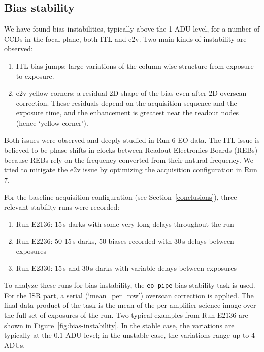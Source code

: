 
\subsection{Bias stability}\label{sec:bias-stability-2}

We have found bias instabilities, typically above the 1 ADU level, for a number of CCDs in the focal plane, both ITL and e2v. Two main kinds of instability are observed:

\begin{enumerate}
\tightlist
\item
  ITL bias jumps: large variations of the column-wise structure from
  exposure to exposure.
\item
  e2v yellow corners: a residual 2D shape of the bias even after
  2D-overscan correction. These residuals depend on the acquisition
  sequence and the exposure time, and the enhancement is greatest near the readout nodes (hence `yellow corner').
\end{enumerate}

Both issues were observed and deeply studied in Run 6 EO data. The ITL
issue is believed to be phase shifts in clocks between Readout
Electronics Boards (REBs) because REBs rely on the frequency converted
from their natural frequency. We tried to mitigate the e2v issue by
optimizing the acquisition configuration in Run 7.

For the baseline acquisition configuration (see Section~\ref{conclusions}), three
relevant stability runs were recorded:

\begin{enumerate}
\tightlist
\item
  Run E2136: 15\,s darks with some very long delays throughout the run
\item
  Run E2236: 50 15\,s darks, 50 biases recorded with 30\,s delays between
  exposures
\item
  Run E2330: 15\,s and 30\,s darks with variable delays between exposures
\end{enumerate}

To analyze these runs for bias instability, the {\tt eo\_pipe} bias
stability task is used.  For the ISR part, a serial
(`mean\_per\_row')
overscan correction is applied. The final data product of the task is the
mean of the per-amplifier science image over the full set of exposures
of the run. Two typical examples from Run E2136 are shown in Figure~\ref{fig:bias-instability}. In the stable case, the variations are typically at the 0.1 ADU
level; in the unstable case, the variations range up to 4 ADUs.

